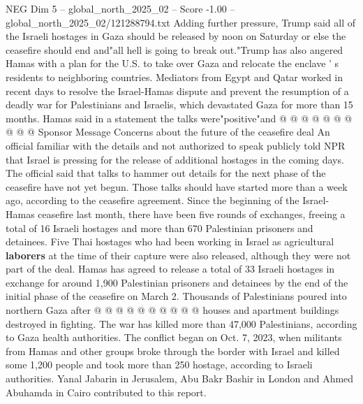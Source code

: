 \begin{textsample}{NEG Dim 5 – global\_north\_2025\_02 – Score -1.00 – global\_north\_2025\_02/121288794.txt}
Adding further pressure, Trump said all of the Israeli hostages in Gaza should be released by noon on Saturday or else the ceasefire should end and"all hell is going to break out."Trump has also angered Hamas with a plan for the U.S. to take over Gaza and relocate the enclave ' s residents to neighboring countries.
Mediators from Egypt and Qatar worked in recent days to resolve the Israel-Hamas dispute and prevent the resumption of a deadly war for Palestinians and Israelis, which devastated Gaza for more than 15 months.
Hamas said in a statement the talks were"positive"and @ @ @ @ @ @ @ @ @ @ Sponsor Message Concerns about the future of the ceasefire deal An official familiar with the details and not authorized to speak publicly told NPR that Israel is pressing for the release of additional hostages in the coming days.
The official said that talks to hammer out details for the next phase of the ceasefire have not yet begun.
Those talks should have started more than a week ago, according to the ceasefire agreement.
Since the beginning of the Israel-Hamas ceasefire last month, there have been five rounds of exchanges, freeing a total of 16 Israeli hostages and more than 670 Palestinian prisoners and detainees.
Five Thai hostages who had been working in Israel as agricultural \textbf{laborers} at the time of their capture were also released, although they were not part of the deal.
Hamas has agreed to release a total of 33 Israeli hostages in exchange for around 1,900 Palestinian prisoners and detainees by the end of the initial phase of the ceasefire on March 2.
Thousands of Palestinians poured into northern Gaza after @ @ @ @ @ @ @ @ @ @ houses and apartment buildings destroyed in fighting.
The war has killed more than 47,000 Palestinians, according to Gaza health authorities.
The conflict began on Oct. 7, 2023, when militants from Hamas and other groups broke through the border with Israel and killed some 1,200 people and took more than 250 hostage, according to Israeli authorities.
Yanal Jabarin in Jerusalem, Abu Bakr Bashir in London and Ahmed Abuhamda in Cairo contributed to this report.

\end{textsample}
